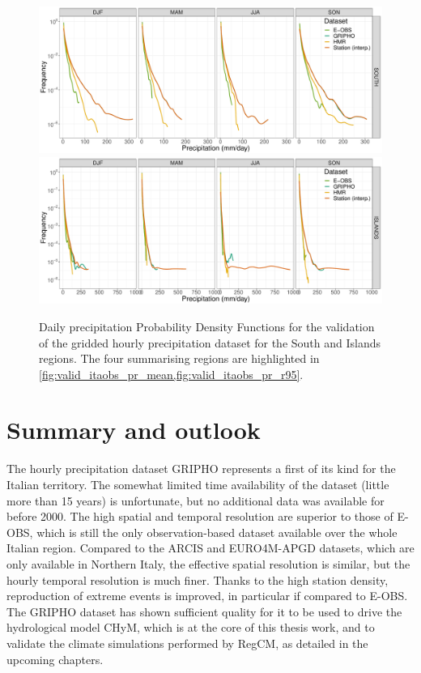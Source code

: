 \begin{figure}
    \centering
        \includegraphics[width=0.8\textheight]{figures/valid_itaobs/pdf_SOUTH_lines}
        \includegraphics[width=0.8\textheight]{figures/valid_itaobs/pdf_ISLANDS_lines}
    \decoRule
    \caption[Validation of gridded hourly dataset: PDFs (2)]{
        Daily precipitation Probability Density Functions for the validation of the gridded hourly precipitation dataset for the South and Islands regions. The four summarising regions are highlighted in \cref{fig:valid_itaobs_pr_mean,fig:valid_itaobs_pr_r95}.
    }\label{fig:valid_itaobs_pr_pdf2}
\end{figure}

\section{Summary and outlook}
The hourly precipitation dataset GRIPHO represents a first of its kind for the Italian territory.
The somewhat limited time availability of the dataset (little more than 15 years) is unfortunate, but no additional data was available for before 2000.
The high spatial and temporal resolution are superior to those of E-OBS, which is still the only observation-based dataset available over the whole Italian region. Compared to the ARCIS and EURO4M-APGD datasets, which are only available in Northern Italy, the effective spatial resolution is similar, but the hourly temporal resolution is much finer.
Thanks to the high station density, reproduction of extreme events is improved, in particular if compared to E-OBS.
The  GRIPHO dataset has shown sufficient quality for it to be used to drive the hydrological model CHyM, which is at the core of this thesis work, and to validate the climate simulations performed by RegCM, as detailed in the upcoming chapters.

